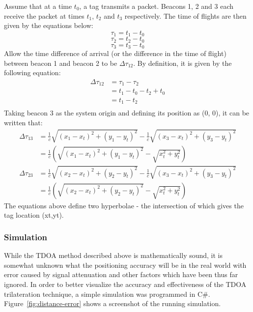 \newpage
Assume that at a time $t_0$, a tag transmits a packet. Beacons 1, 2 and 3 each receive the packet at times $t_1$, $t_2$ and $t_3$ respectively. The time of flights are then given by the equations below:
$$\tau_1 = t_1 - t_0$$
$$\tau_2 = t_2 - t_0$$
$$\tau_3 = t_3 - t_0$$
Allow the time difference of arrival (or the difference in the time of flight) between beacon 1 and beacon 2 to be $\Delta \tau_{12}$. By definition, it is given by the following equation:
\begin{equation*}
\begin{split}
\Delta \tau_{12} &= \tau_1 - \tau_2\\
 &= t_1 - t_0 - t_2 + t_0\\
 &= t_1 - t_2\\
\end{split}
\end{equation*}
Taking beacon 3 as the system origin and defining its position as (0, 0), it can be written that:
\begin{equation*}
\begin{split}
\Delta \tau_{13} &= \frac{1}{c} \sqrt{(x_1-x_t)^2 + (y_1-y_t)^2} - \frac{1}{c} \sqrt{(x_3-x_t)^2 + (y_3-y_t)^2}\\ 
&= \frac{1}{c} (\sqrt{(x_1-x_t)^2 + (y_1-y_t)^2} - \sqrt{x_t^2 + y_t^2})
\end{split}
\end{equation*}
\begin{equation*}
\begin{split}
\Delta \tau_{23} &= \frac{1}{c} \sqrt{(x_2-x_t)^2 + (y_2-y_t)^2} - \frac{1}{c} \sqrt{(x_3-x_t)^2 + (y_3-y_t)^2}\\ 
&= \frac{1}{c} (\sqrt{(x_2-x_t)^2 + (y_2-y_t)^2} - \sqrt{x_t^2 + y_t^2})
\end{split}
\end{equation*}
The equations above define two hyperbolae - the intersection of which gives the tag location (xt,yt).\cite{gaffney}

\subsubsection{Simulation}\label{sim}

While the TDOA method described above is mathematically sound, it is somewhat unknown what the positioning accuracy will be in the real world with error caused by signal attenuation and other factors which have been thus far ignored. In order to better visualize the accuracy and effectiveness of the TDOA trilateration technique, a simple simulation was programmed in C\#. Figure~\ref{fig:distance-error} shows a screenshot of the running simulation.

